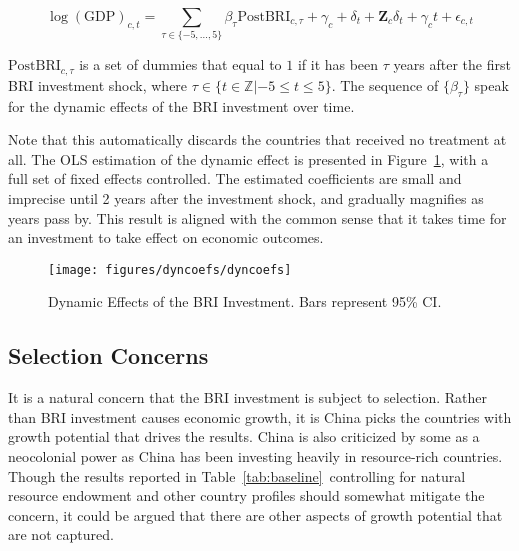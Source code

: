 \documentclass[10pt,a4paper]{article}
\begin{document}
\begin{equation}
\label{eq:dynamic}
\log(\textrm{GDP})_{c,t} = \sum_{\tau \in \{-5,\dots, 5\}} \beta_{\tau} \textrm{PostBRI}_{c,\tau} + \gamma_c + \delta_t + \mathbf{Z}_c\delta_t + \gamma_c t  + \epsilon_{c,t}
\end{equation}

$\textrm{PostBRI}_{c,\tau}$ is a set of dummies that equal to $1$ if it has been $\tau$ years after the first BRI investment shock, where $\tau\in\{t \in \mathbb{Z}| -5 \leq t \leq 5 \}$.
The sequence of $\{ \beta_{\tau} \}$ speak for the dynamic effects of the BRI investment over time.


Note that this automatically discards the countries that received no
treatment at all. The OLS estimation of the dynamic effect is presented
in Figure~{\ref{685807}}, with a full set of fixed
effects controlled. The estimated coefficients are small and imprecise
until 2 years after the investment shock, and gradually magnifies as
years pass by. This result is aligned with the common sense that it
takes time for an investment to take effect on economic outcomes.~
\begin{figure}[H]
\begin{center}
\texttt{[image: figures/dyncoefs/dyncoefs]}
\caption{{Dynamic Effects of the BRI Investment. Bars represent 95\% CI.
{\label{685807}}%
}}
\end{center}
\end{figure}

\subsection{Selection Concerns}

{\label{310737}}

It is a natural concern that the BRI investment is subject to selection.
Rather than BRI investment causes economic growth, it is China picks the
countries with growth potential that drives the results. China is also
criticized by some as a neocolonial power as China has been investing
heavily in resource-rich countries. Though the results reported in
Table~{\ref{tab:baseline}}~controlling for natural
resource endowment and other country profiles should somewhat mitigate
the concern, it could be argued that there are other aspects of growth
potential that are not captured.
\end{document}
